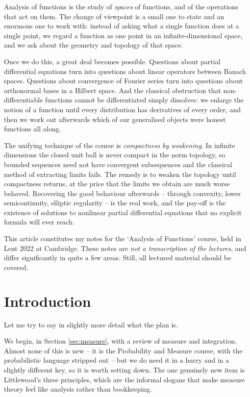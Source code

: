 



Analysis of functions is the study of \emph{spaces} of functions, and of the operations that act on them. The change of viewpoint is a small one to state and an enormous one to work with: instead of asking what a single function does at a single point, we regard a function as one point in an infinite-dimensional space, and we ask about the geometry and topology of that space.

Once we do this, a great deal becomes possible. Questions about partial differential equations turn into questions about linear operators between Banach spaces. Questions about convergence of Fourier series turn into questions about orthonormal bases in a Hilbert space. And the classical obstruction that non-differentiable functions cannot be differentiated simply dissolves: we enlarge the notion of a function until every distribution has derivatives of every order, and then we work out afterwards which of our generalised objects were honest functions all along.

The unifying technique of the course is \emph{compactness by weakening}. In infinite dimensions the closed unit ball is never compact in the norm topology, so bounded sequences need not have convergent subsequences and the classical method of extracting limits fails. The remedy is to weaken the topology until compactness returns, at the price that the limits we obtain are much worse behaved. Recovering the good behaviour afterwards -- through convexity, lower semicontinuity, elliptic regularity -- is the real work, and the pay-off is the existence of solutions to nonlinear partial differential equations that no explicit formula will ever reach.

This article constitutes my notes for the `Analysis of Functions' course, held in Lent 2022 at Cambridge. These notes are \emph{not a transcription of the lectures}, and differ significantly in quite a few areas. Still, all lectured material should be covered.



\section{Introduction}

Let me try to say in slightly more detail what the plan is.

We begin, in Section \ref{sec:measure}, with a review of measure and integration. Almost none of this is new -- it is the Probability and Measure course, with the probabilistic language stripped out -- but we do need it in a hurry and in a slightly different key, so it is worth setting down. The one genuinely new item is Littlewood's three principles, which are the informal slogans that make measure theory feel like analysis rather than bookkeeping.

